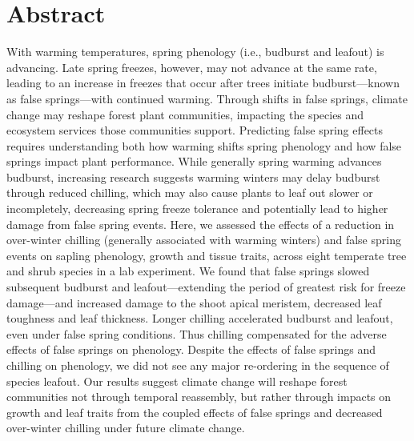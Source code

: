 \documentclass{article}\usepackage[]{graphicx}\usepackage[]{color}
\begin{document}
\section*{Abstract} %
With warming temperatures, spring phenology (i.e., budburst and leafout) is advancing. Late spring freezes, however, may not advance at the same rate, leading to an increase in freezes that occur after trees initiate budburst---known as false springs---with continued warming. Through shifts in false springs, climate change may reshape forest plant communities, impacting the species and ecosystem services those communities support. Predicting false spring effects requires understanding both how warming shifts spring phenology and how false springs impact plant performance. While generally spring warming advances budburst, increasing research suggests warming winters may delay budburst through reduced chilling, which may also cause plants to leaf out slower or incompletely, decreasing spring freeze tolerance and potentially lead to higher damage from false spring events. Here, we assessed the effects of a reduction in over-winter chilling (generally associated with warming winters) and false spring events on sapling phenology, growth and tissue traits, across eight temperate tree and shrub species in a lab experiment. We found that false springs slowed subsequent budburst and leafout---extending the period of greatest risk for freeze damage---and increased damage to the shoot apical meristem, decreased leaf toughness and leaf thickness. Longer chilling accelerated budburst and leafout, even under false spring conditions. Thus chilling compensated for the adverse effects of false springs on phenology. Despite the effects of false springs and chilling on phenology, we did not see any major re-ordering in the sequence of species leafout. Our results suggest climate change will reshape forest communities not through temporal reassembly, but rather through impacts on growth and leaf traits from the coupled effects of false springs and decreased over-winter chilling under future climate change. 

\end{document}
